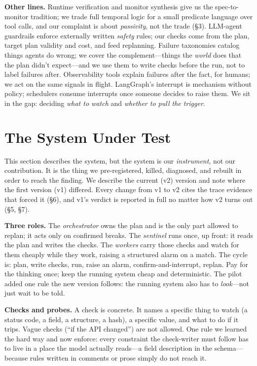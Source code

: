 \documentclass[acmsmall,screen]{acmart}
\begin{document}
\textbf{Other lines.} Runtime verification and monitor synthesis \cite{ref4,
ref5} give us the spec-to-monitor tradition; we trade full temporal logic for a
small predicate language over tool calls, and our complaint is about
\emph{passivity}, not the trade (\S3). LLM-agent guardrails \cite{ref9, ref10,
ref11, ref12, ref13} enforce externally written \emph{safety} rules; our checks
come from the plan, target plan validity and cost, and feed replanning. Failure
taxonomies \cite{ref14, ref20} catalog things agents do wrong; we cover the
complement---things the \emph{world} does that the plan didn't expect---and we
use them to write checks before the run, not to label failures after.
Observability tools \cite{ref15, ref16, ref17, ref18} explain failures after
the fact, for humans; we act on the same signals in flight. LangGraph's
interrupt \cite{ref22} is mechanism without policy; schedulers \cite{ref19}
consume interrupts once someone decides to raise them. We sit in the gap:
deciding \emph{what to watch} and \emph{whether to pull the trigger}.

\section{The System Under Test}
This section describes the system, but the system is our \emph{instrument}, not
our contribution. It is the thing we pre-registered, killed, diagnosed, and
rebuilt in order to reach the finding. We describe the current (v2) version and
note where the first version (v1) differed. Every change from v1 to v2 cites
the trace evidence that forced it (\S6), and v1's verdict is reported in full
no matter how v2 turns out (\S5, \S7).

\textbf{Three roles.} The \emph{orchestrator} owns the plan and is the only
part allowed to replan; it acts only on confirmed breaks. The \emph{sentinel}
runs once, up front: it reads the plan and writes the checks. The \emph{workers}
carry those checks and watch for them cheaply while they work, raising a
structured alarm on a match. The cycle is: plan, write checks, run, raise an
alarm, confirm-and-interrupt, replan. Pay for the thinking once; keep the
running system cheap and deterministic. The pilot added one rule the new
version follows: the running system also has to \emph{look}---not just wait to
be told.

\textbf{Checks and probes.} A check is concrete. It names a specific thing to
watch (a status code, a field, a structure, a hash), a specific value, and what
to do if it trips. Vague checks (``if the API changed'') are not allowed. One
rule we learned the hard way and now enforce: every constraint the check-writer
must follow has to live in a place the model actually reads---a field
description in the schema---because rules written in comments or prose simply do
not reach it.
\end{document}
